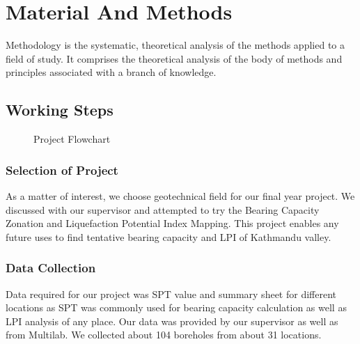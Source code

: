 \chapter{Material And Methods}
Methodology is the systematic, theoretical analysis of the methods applied to a field of study. It comprises the theoretical analysis of the body of methods and principles associated with a branch of knowledge.

\section{Working Steps}
\begin{figure}
\caption{Project Flowchart}
\end{figure}

\subsection{Selection of Project}
As a matter of interest, we choose geotechnical field for our final year project. We discussed with our supervisor and attempted to try the Bearing Capacity Zonation and Liquefaction Potential Index Mapping. This project enables any future uses to find tentative bearing capacity and LPI of Kathmandu valley.

\subsection{Data Collection}
Data required for our project was SPT value and summary sheet for different locations as SPT was commonly used for bearing capacity calculation as well as LPI analysis of any place. Our data was provided by our supervisor as well as from Multilab. We collected about 104 boreholes from about 31 locations.

